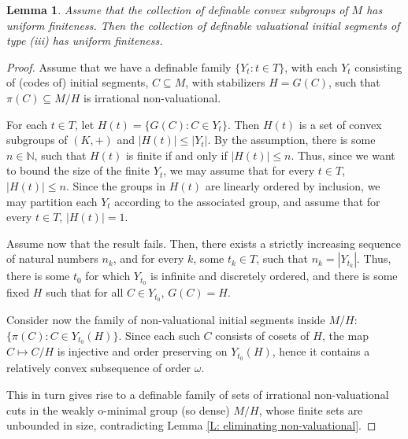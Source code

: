 \documentclass[11pt]{amsart}
\newtheorem{lemma}[theorem]{Lemma}
\theoremstyle{definition}
\newcommand{\0}{\emptyset}
\def\sub{\subseteq}
\begin{document}
\begin{lemma} \label{L: eliminating type (iii)}
	Assume that the collection of definable convex subgroups of $M$ has uniform finiteness. Then the collection of definable valuational initial segments of type (iii) has uniform finiteness.
\end{lemma}
\begin{proof}
	Assume that we have a definable family $\{Y_t:t\in T\}$, with each $Y_t$ consisting of (codes of) initial segments, $C\sub M$, with stabilizers $H=G(C)$, such that $\pi(C)\sub M/H$ is irrational non-valuational.  

    
	 For each $t\in T$, let $H(t)=\{G(C):C\in Y_t\}$. Then $H(t)$ is a set of convex subgroups of $(K,+)$ and  $|H(t)|\leq |Y_t|$. By the assumption, there is some $n\in \mathbb{N}$, such that $H(t)$ is finite if and only if $|H(t)|\leq n$. Thus, since we want to bound the size of the finite $Y_t$, we may assume that for every $t\in T$, $|H(t)|\leq n$. Since the groups in $H(t)$ are linearly ordered by inclusion, we may partition each $Y_t$ according to the associated group, and assume that for every $t\in T$, $|H(t)|=1$.

     
Assume now that the result fails.
    Then, there exists a strictly increasing sequence of natural numbers $n_k$, and for every $k$, some $t_k\in T$, such that $n_k=|Y_{t_k}|$. Thus,  there is some $t_0$ for which $Y_{t_0}$ is infinite and discretely ordered, and there is some fixed $H$ such that for all $C\in Y_{t_0}$, $G(C)=H$.
    
    Consider now the family of non-valuational initial segments inside $M/H$: $\{\pi(C):C\in Y_{t_0}(H)\}$. Since each such $C$ consists of cosets of $H$, the map $C\mapsto C/H$ is injective and order preserving on $Y_{t_0}(H)$, hence it contains a relatively convex subsequence of order $\omega$.
	
	
	This in turn gives rise to a definable family of  sets of irrational non-valuational cuts in the weakly o-minimal group (so dense) $M/H$, whose finite sets are unbounded in size, contradicting  Lemma \ref{L: eliminating non-valuational}. 
\end{proof}
\end{document}
